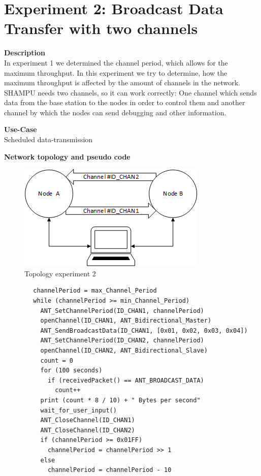 \section{Experiment 2: Broadcast Data Transfer with two channels}
\begin{description} 
	\item{\textbf{Description}} \hfill \\ In experiment 1 we determined the channel period, which allows for the maximum throughput. In this experiment we try to determine, how the maximum throughput is affected by the amount of channels in the network. SHAMPU needs two channels, so it can work correctly: One channel which sends data from the base station to the nodes in order to control them and another channel by which the nodes can send debugging and other information.
	\item{\textbf{Use-Case}} \hfill \\ Scheduled data-transmission	
	\item{\textbf{Network topology and pseudo code}} \hfill
	\begin{figure}[H]
		\centering
		\includegraphics[scale=1]{content/images/exp2_topo.png}
		\caption{Topology experiment 2}
	\end{figure}
	\begin{code}[H]
		\begin{verbatim}
		channelPeriod = max_Channel_Period
		while (channelPeriod >= min_Channel_Period) 
		  ANT_SetChannelPeriod(ID_CHAN1, channelPeriod)
		  openChannel(ID_CHAN1, ANT_Bidirectional_Master)
		  ANT_SendBroadcastData(ID_CHAN1, [0x01, 0x02, 0x03, 0x04])
		  ANT_SetChannelPeriod(ID_CHAN2, channelPeriod)
		  openChannel(ID_CHAN2, ANT_Bidirectional_Slave)
		  count = 0
		  for (100 seconds) 
		    if (receivedPacket() == ANT_BROADCAST_DATA)
		      count++			
		  print (count * 8 / 10) + " Bytes per second"
		  wait_for_user_input()
		  ANT_CloseChannel(ID_CHAN1)
		  ANT_CloseChannel(ID_CHAN2)
		  if (channelPeriod >= 0x01FF)
		    channelPeriod = channelPeriod >> 1
		  else
		    channelPeriod = channelPeriod - 10
		 \end{verbatim}
		\caption{Broadcast data transfer two channels (Master)}\label{lst:mExp2}
	\end{code}
	

\end{description}
